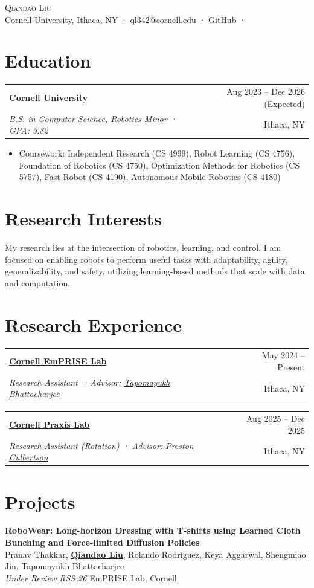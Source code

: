 \documentclass[10pt, a4paper]{article}
\makeatletter
\newcommand{\cventry}[4]{%
\begin{tabularx}{\textwidth}{@{}X r@{}}
\textbf{#1} & \textcolor{secondary}{\small #2} \\[-0.1em]
\textit{\textcolor{secondary}{#3}} & \textcolor{secondary}{\small #4}
\end{tabularx}\vspace{0.1em}}
\newcommand{\publication}[5]{%
\textbf{#1}\\[0.2em]
{\small\textcolor{secondary}{#2}}\\[0.1em]
{\small\textit{#3}}
\hfill\textcolor{secondary}{\small #4, #5}
\vspace{0.4em}}
\newcommand{\sep}{\textcolor{secondary!60}{ · }}
\makeatother
\begin{document}
\begin{center}
{\Large\scshape\color{primary} Qiandao Liu}\\[0.4em]
\textcolor{secondary}{\small
Cornell University, Ithaca, NY\sep
\href{mailto:ql342@cornell.edu}{ql342@cornell.edu}\sep
\href{https://github.com/Qiandao-Liu}{GitHub}\sep
}
\end{center}

\section{Education}
\cventry{Cornell University}{Aug 2023 -- Dec 2026 (Expected)}{B.S. in Computer Science, Robotics Minor \sep GPA: 3.82}{Ithaca, NY}
\begin{itemize}[leftmargin=1em, itemsep=0pt, topsep=1pt, parsep=0pt, label={\textcolor{secondary}{--}}]
\item Coursework: Independent Research (CS 4999), Robot Learning (CS 4756), Foundation of Robotics (CS 4750), Optimization Methods for Robotics (CS 5757), Fast Robot (CS 4190), Autonomous Mobile Robotics (CS 4180)
\end{itemize}

\section{Research Interests}
My research lies at the intersection of robotics, learning, and control. I am focused on enabling robots to perform useful tasks with adaptability, agility, generalizability, and safety, utilizing learning-based methods that scale with data and computation.

\section{Research Experience}
\cventry{\href{https://emprise.cs.cornell.edu/}{Cornell EmPRISE Lab}}{May 2024 -- Present}{Research Assistant \sep Advisor: \href{https://sites.google.com/site/tapomayukh}{Tapomayukh Bhattacharjee}}{Ithaca, NY}

\vspace{0.15em}
\cventry{\href{https://pculbertson.github.io/}{Cornell Praxis Lab}}{Aug 2025 -- Dec 2025}{Research Assistant (Rotation) \sep Advisor: \href{https://pculbertson.github.io/}{Preston Culbertson}}{Ithaca, NY}

\section{Projects}
\publication{RoboWear: Long-horizon Dressing with T-shirts using Learned Cloth Bunching and Force-limited Diffusion Policies}
{Pranav Thakkar, \textbf{\underline{Qiandao Liu}}, Rolando Rodríguez, Keya Aggarwal, Shengmiao Jin, Tapomayukh Bhattacharjee}
{Under Review RSS 26}
{EmPRISE Lab}{Cornell}
\end{document}
